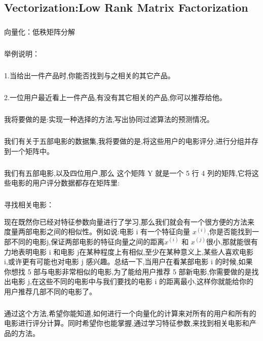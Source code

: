 \documentclass{article}
\begin{document}
\begin{CJK}{UTF8}{gbsn}
\subsection{Vectorization:Low Rank Matrix Factorization}
\subparagraph{}
向量化：低秩矩阵分解
\subparagraph{}
举例说明：
\subparagraph{}
1.当给出一件产品时,你能否找到与之相关的其它产品。
\subparagraph{}
2.一位用户最近看上一件产品,有没有其它相关的产品,你可以推荐给他。
\subparagraph{}
我将要做的是:实现一种选择的方法,写出协同过滤算法的预测情况。
\subparagraph{}
我们有关于五部电影的数据集,我将要做的是,将这些用户的电影评分,进行分组并存到一个矩阵中。
\begin{figure}[H]
\label{fig:9910}
\end{figure}
\subparagraph{}
我们有五部电影,以及四位用户,那么 这个矩阵 Y 就是一个 5 行 4 列的矩阵,它将这些电影的用户评分数据都存在矩阵里:
\begin{figure}[H]
\label{fig:9912}
\end{figure}
\subparagraph{}
寻找相关电影：
\begin{figure}[H]
\label{fig:9915}
\end{figure}
现在既然你已经对特征参数向量进行了学习,那么我们就会有一个很方便的方法来度量两部电影之间的相似性。例如说:电影 i 有一个特征向量 $x^{(i)}$,你是否能找到一部不同的电影j,保证两部电影的特征向量之间的距离$x^{(i)}$ 和 $x^{(j)}$很小,那就能很有力地表明电影 i 和电影 j在某种程度上有相似,至少在某种意义上,某些人喜欢电影 i,或许更有可能也对电影 j 感兴趣。总结一下,当用户在看某部电影 i 的时候,如果你想找 5 部与电影非常相似的电影,为了能给用户推荐 5 部新电影,你需要做的是找出电影 j,在这些不同的电影中与我们要找的电影 i 的距离最小,这样你就能给你的用户推荐几部不同的电影了。
\subparagraph{}
通过这个方法,希望你能知道,如何进行一个向量化的计算来对所有的用户和所有的电影进行评分计算。同时希望你也能掌握,通过学习特征参数,来找到相关电影和产品的方法。
\begin{figure}[H]
\label{fig:9913}
\end{figure}

\end{CJK}
\end{document}
